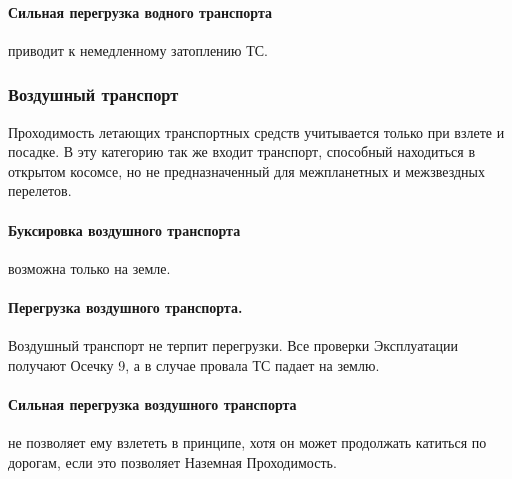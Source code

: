 \paragraph{Сильная перегрузка водного транспорта} приводит к немедленному затоплению ТС.


\subsubsection{Воздушный транспорт}
Проходимость летающих транспортных средств учитывается только при взлете и посадке. В эту категорию так же входит транспорт, способный находиться в открытом косомсе, но не предназначенный для межпланетных и межзвездных перелетов.
\paragraph{Буксировка воздушного транспорта} возможна только на земле.
\paragraph{Перегрузка воздушного транспорта.} Воздушный транспорт не терпит перегрузки. Все проверки Эксплуатации получают Осечку 9, а в случае провала ТС падает на землю.
\paragraph{Сильная перегрузка воздушного транспорта} не позволяет ему взлететь в принципе, хотя он может продолжать катиться по дорогам, если это позволяет Наземная Проходимость.


